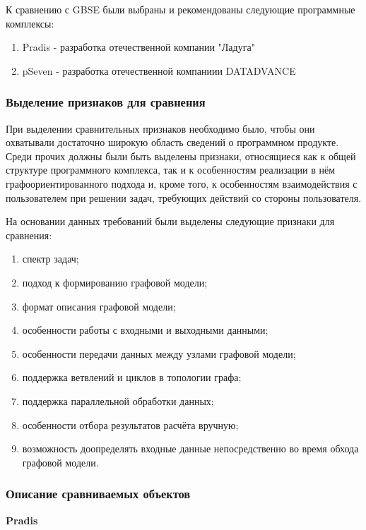 \def\notedate{2022.02.09}
\def\currentauthor{Тришин И.В. (РК6)}%

К сравнению с GBSE были выбраны и рекомендованы следующие программные комплексы:
\begin{enumerate}
    \item Pradis - разработка отечественной компании "Ладуга"
    \item pSeven - разработка отечественной компаниии DATADVANCE
\end{enumerate}

\subsubsection{Выделение признаков для сравнения}
При выделении сравнительных признаков необходимо было, чтобы они охватывали достаточно широкую область сведений о программном продукте. Среди прочих должны были быть выделены признаки, относящиеся как к общей структуре программного комплекса, так и к особенностям реализации в нём графоориентированного подхода и, кроме того, к особенностям взаимодействия с пользователем при решении задач, требующих действий со стороны пользователя.

На основании данных требований были выделены следующие признаки для сравнения:
\begin{enumerate}
    \item спектр задач;
    \item подход к формированию графовой модели;
    \item формат описания графовой модели;
    \item особенности работы с входными и выходными данными;
    \item особенности передачи данных между узлами графовой модели;
    \item поддержка ветвлений и циклов в топологии графа;
    \item поддержка параллельной обработки данных;
    \item особенности отбора результатов расчёта вручную;
    \item возможность доопределять входные данные непосредственно во время обхода графовой модели.
\end{enumerate}

\subsubsection{Описание сравниваемых объектов}
\textbf{Pradis}


